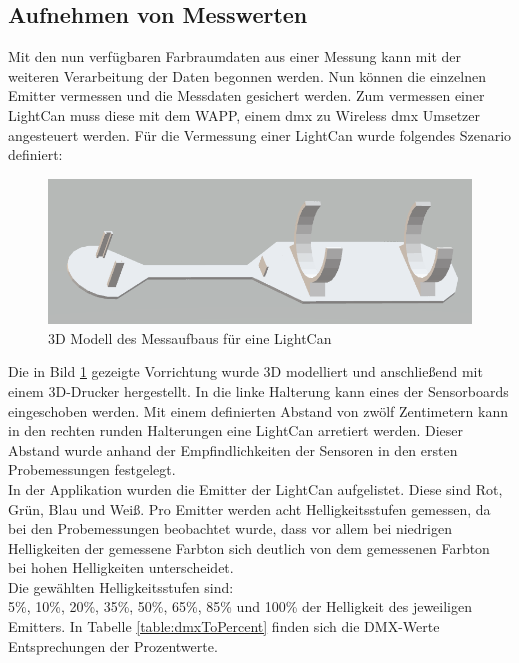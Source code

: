 \documentclass[11pt]{scrartcl}
\begin{document}
\subsection{Aufnehmen von Messwerten}
Mit den nun verfügbaren Farbraumdaten aus einer Messung kann mit der weiteren Verarbeitung der Daten begonnen werden. Nun können die einzelnen
Emitter vermessen und die Messdaten gesichert werden. Zum vermessen einer LightCan muss diese mit dem WAPP, einem \ac{dmx} zu Wireless \ac{dmx}
Umsetzer angesteuert werden. Für die Vermessung einer LightCan wurde folgendes Szenario definiert:
\begin{figure}[H]
    \begin{center}
        \includegraphics[width=\textwidth]{images/light_can_holder_3d.png}
    \end{center}
    \caption{3D Modell des Messaufbaus für eine LightCan}\label{fig:3DCanHolder}
\end{figure}
\noindent
Die in Bild \ref{fig:3DCanHolder} gezeigte Vorrichtung wurde 3D modelliert und anschließend mit einem 3D-Drucker hergestellt. In die linke
Halterung kann eines der Sensorboards eingeschoben werden. Mit einem definierten Abstand von zwölf Zentimetern kann in den rechten runden Halterungen
eine LightCan arretiert werden. Dieser Abstand wurde anhand der Empfindlichkeiten der Sensoren in den ersten Probemessungen festgelegt.\\
In der Applikation wurden die Emitter der LightCan aufgelistet. Diese sind Rot, Grün, Blau und Weiß. Pro Emitter werden acht Helligkeitsstufen
gemessen, da bei den Probemessungen beobachtet wurde, dass vor allem bei niedrigen Helligkeiten der gemessene Farbton sich deutlich von dem
gemessenen Farbton bei hohen Helligkeiten unterscheidet.\\
Die gewählten Helligkeitsstufen sind:\\
5\%, 10\%, 20\%, 35\%, 50\%, 65\%, 85\% und 100\% der Helligkeit des jeweiligen Emitters. In Tabelle \ref{table:dmxToPercent} finden sich die DMX-Werte
Entsprechungen der Prozentwerte.\\
\end{document}

